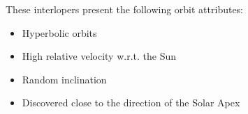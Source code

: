\documentclass[xcolor={dvipsnames}]{beamer}
\begin{document}
\begin{frame}
\pause
\vspace{-0.25cm}
These interlopers present the following orbit attributes:
\vspace{0.1cm}

\begin{itemize}
    \item Hyperbolic orbits
    \item High relative velocity w.r.t. the Sun
    \item Random inclination
    \item Discovered close to the direction of the Solar Apex
\end{itemize}

\end{frame}

\end{document}
